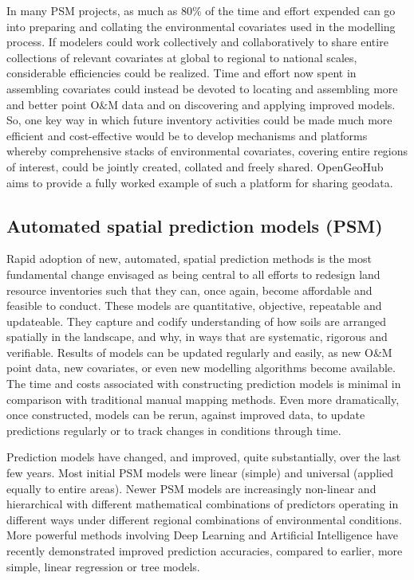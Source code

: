 \documentclass[graybox,natbib,nospthms,UStrade]{svmono}
\begin{document}
In many PSM projects, as much as 80\% of the time and effort expended can
go into preparing and collating the environmental covariates used in the
modelling process. If modelers could work collectively and
collaboratively to share entire collections of relevant covariates at
global to regional to national scales, considerable efficiencies could
be realized. Time and effort now spent in assembling covariates could
instead be devoted to locating and assembling more and better point O\&M
data and on discovering and applying improved models. So, one key way in
which future inventory activities could be made much more efficient and
cost-effective would be to develop mechanisms and platforms whereby
comprehensive stacks of environmental covariates, covering entire
regions of interest, could be jointly created, collated and freely shared.
OpenGeoHub aims to provide a fully worked example of such a platform for
sharing geodata.

\hypertarget{automated-spatial-prediction-models-psm}{%
\subsection{Automated spatial prediction models (PSM)}\label{automated-spatial-prediction-models-psm}}

Rapid adoption of new, automated, spatial prediction methods is the most
fundamental change envisaged as being central to all efforts to redesign
land resource inventories such that they can, once again, become
affordable and feasible to conduct. These models are quantitative,
objective, repeatable and updateable. They capture and codify
understanding of how soils are arranged spatially in the landscape, and
why, in ways that are systematic, rigorous and verifiable. Results of
models can be updated regularly and easily, as new O\&M point data, new
covariates, or even new modelling algorithms become available. The time
and costs associated with constructing prediction models is minimal in
comparison with traditional manual mapping methods. Even more
dramatically, once constructed, models can be rerun, against improved
data, to update predictions regularly or to track changes in conditions
through time.

Prediction models have changed, and improved, quite substantially, over
the last few years. Most initial PSM models were linear (simple) and
universal (applied equally to entire areas). Newer PSM models are
increasingly non-linear and hierarchical with different mathematical
combinations of predictors operating in different ways under different
regional combinations of environmental conditions. More powerful methods
involving Deep Learning and Artificial Intelligence have recently
demonstrated improved prediction accuracies, compared to earlier, more
simple, linear regression or tree models.
\end{document}
